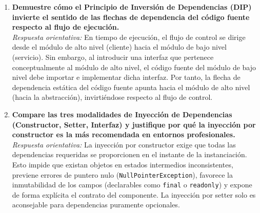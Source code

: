 \begin{enumerate}[leftmargin=1.8em]
  \item \textbf{Demuestre cómo el Principio de Inversión de Dependencias (DIP) invierte el sentido de las flechas de dependencia del código fuente respecto al flujo de ejecución.} \\
  \emph{Respuesta orientativa:} En tiempo de ejecución, el flujo de control se dirige desde el módulo de alto nivel (cliente) hacia el módulo de bajo nivel (servicio). Sin embargo, al introducir una interfaz que pertenece conceptualmente al módulo de alto nivel, el código fuente del módulo de bajo nivel debe importar e implementar dicha interfaz. Por tanto, la flecha de dependencia estática del código fuente apunta hacia el módulo de alto nivel (hacia la abstracción), invirtiéndose respecto al flujo de control.

  \item \textbf{Compare las tres modalidades de Inyección de Dependencias (Constructor, Setter, Interfaz) y justifique por qué la inyección por constructor es la más recomendada en entornos profesionales.} \\
  \emph{Respuesta orientativa:} La inyección por constructor exige que todas las dependencias requeridas se proporcionen en el instante de la instanciación. Esto impide que existan objetos en estados intermedios inconsistentes, previene errores de puntero nulo (\texttt{NullPointerException}), favorece la inmutabilidad de los campos (declarables como \texttt{final} o \texttt{readonly}) y expone de forma explícita el contrato del componente. La inyección por setter solo es aconsejable para dependencias puramente opcionales.
\end{enumerate}

